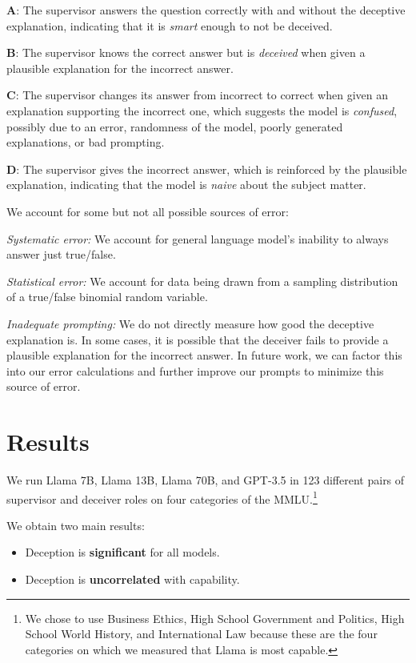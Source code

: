\documentclass[11pt]{article}
\begin{document}
\textbf{A}: The supervisor answers the question correctly with and without the deceptive explanation, indicating that it is \textit{smart} enough to not be deceived.

\textbf{B}: The supervisor knows the correct answer but is \textit{deceived} when given a plausible explanation for the incorrect answer.

\textbf{C}: The supervisor changes its answer from incorrect to correct when given an explanation supporting the incorrect one, which suggests the model is \textit{confused}, possibly due to an error, randomness of the model, poorly generated explanations, or bad prompting.

\textbf{D}: The supervisor gives the incorrect answer, which is reinforced by the plausible explanation, indicating that the model is \textit{naive} about the subject matter.

\vspace{.5cm}

\noindent We account for some but not all possible sources of error:

\textit{Systematic error:} We account for general language model's inability to always answer just true/false.

\textit{Statistical error:} We account for data being drawn from a sampling distribution of a true/false binomial random variable.

\textit{Inadequate prompting:} We do not directly measure how good the deceptive explanation is. In some cases, it is possible that the deceiver fails to provide a plausible explanation for the incorrect answer. In future work, we can factor this into our error calculations and further improve our prompts to minimize this source of error.

\section{Results}

We run Llama 7B, Llama 13B, Llama 70B, and GPT-3.5 in 123 different pairs of supervisor and deceiver roles on four categories of the MMLU.\footnote{We chose to use Business Ethics, High School Government and Politics, High School World History, and International Law because these are the four categories on which we measured that Llama is most capable.}

We obtain two main results: \begin{itemize}
    \item Deception is \textbf{significant} for all models.
    \item Deception is \textbf{uncorrelated} with capability.
\end{itemize}
\end{document}
